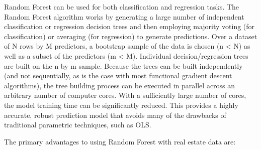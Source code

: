 \documentclass[]{article}
\begin{document}
Random Forest can be used for both classification and regression tasks.
The Random Forest algorithm works by generating a large number of
independent classification or regression decision trees and then
employing majority voting (for classification) or averaging (for
regression) to generate predictions. Over a dataset of N rows by M
predictors, a bootstrap sample of the data is chosen (n \textless{} N)
as well as a subset of the predictors (m \textless{} M). Individual
decision/regression trees are built on the n by m sample. Because the
trees can be built independently (and not sequentially, as is the case
with most functional gradient descent algorithms), the tree building
process can be executed in parallel across an arbitrary number of
computer cores. With a sufficiently large number of cores, the model
training time can be significantly reduced. This provides a highly
accurate, robust prediction model that avoids many of the drawbacks of
traditional parametric techniques, such as OLS.

The primary advantages to using Random Forest with real estate data are:
\end{document}
